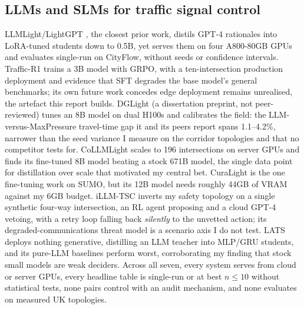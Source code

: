 \subsection{LLMs and SLMs for traffic signal control}\label{sec:bg-llmtsc}

LLMLight/LightGPT \cite{lai2023llmlight}, the closest prior work, distils GPT-4 rationales into LoRA-tuned students down to 0.5B, yet serves them on four A800-80GB GPUs and evaluates single-run on CityFlow, without seeds or confidence intervals. Traffic-R1 \cite{wang2025trafficr1} trains a 3B model with GRPO, with a ten-intersection production deployment and evidence that SFT degrades the base model's general benchmarks; its own future work concedes edge deployment remains unrealised, the artefact this report builds. DGLight \cite{dglight2026} (a dissertation preprint, not peer-reviewed) tunes an 8B model on dual H100s and calibrates the field: the LLM-versus-MaxPressure travel-time gap it and its peers report spans 1.1--4.2\%, narrower than the seed variance I measure on the corridor topologies and that no competitor tests for. CoLLMLight \cite{collmlight2025} scales to 196 intersections on server GPUs and finds its fine-tuned 8B model beating a stock 671B model, the single data point for distillation over scale that motivated my central bet. CuraLight \cite{curalight2026} is the one fine-tuning work on SUMO, but its 12B model needs roughly 44GB of VRAM against my 6GB budget. iLLM-TSC \cite{pang2024illmtsc} inverts my safety topology on a single synthetic four-way intersection, an RL agent proposing and a cloud GPT-4 vetoing, with a retry loop falling back \emph{silently} to the unvetted action; its degraded-communications threat model is a scenario axis I do not test. LATS \cite{lats2026} deploys nothing generative, distilling an LLM teacher into MLP/GRU students, and its pure-LLM baselines perform worst, corroborating my finding that stock small models are weak deciders. Across all seven, every system serves from cloud or server GPUs, every headline table is single-run or at best $n\le10$ without statistical tests, none pairs control with an audit mechanism, and none evaluates on measured UK topologies.
